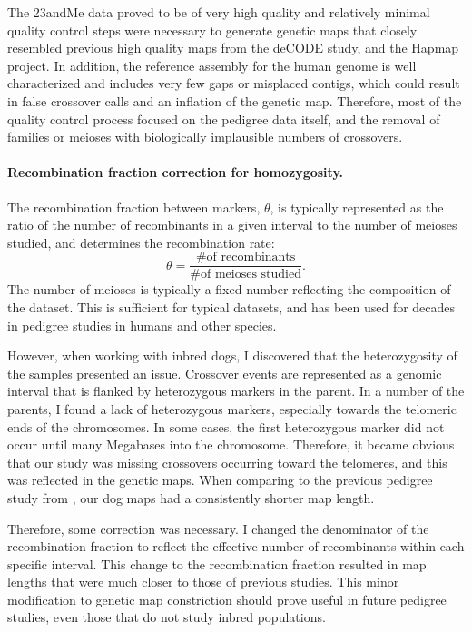 The 23andMe data proved to be of very high quality and relatively minimal quality control steps were necessary to generate genetic maps that closely resembled previous high quality maps from the deCODE study\cite{Kong2010}, and the Hapmap project\cite{hapmap2007}.
In addition, the reference assembly for the human genome is well characterized and includes very few gaps or misplaced contigs, which could result in false crossover calls and an inflation of the genetic map.
Therefore, most of the quality control process focused on the pedigree data itself, and the removal of families or meioses with biologically implausible numbers of crossovers.

\paragraph{Recombination fraction correction for homozygosity.}
The recombination fraction between markers, $\theta$, is typically represented as the ratio of the number of recombinants in a given interval to the number of meioses studied, and determines the recombination rate:
\begin{equation*}
    \theta = \frac{ \text{\# of recombinants} } { \text{\# of meioses studied} } .
\end{equation*}
The number of meioses is typically a fixed number reflecting the composition of the dataset.
This is sufficient for typical datasets, and has been used for decades in pedigree studies in humans and other species.

However, when working with inbred dogs, I discovered that the heterozygosity of the samples presented an issue.
Crossover events are represented as a genomic interval that is flanked by heterozygous markers in the parent.
In a number of the parents, I found a lack of heterozygous markers, especially towards the telomeric ends of the chromosomes.
In some cases, the first heterozygous marker did not occur until many Megabases into the chromosome.
Therefore, it became obvious that our study was missing crossovers occurring toward the telomeres, and this was reflected in the genetic maps.
When comparing to the previous pedigree study from \citet{Wong2010}, our dog maps had a consistently shorter map length.

Therefore, some correction was necessary.
I changed the denominator of the recombination fraction to reflect the effective number of recombinants within each specific interval.
This change to the recombination fraction resulted in map lengths that were much closer to those of previous studies.
This minor modification to genetic map constriction should prove useful in future pedigree studies, even those that do not study inbred populations.


